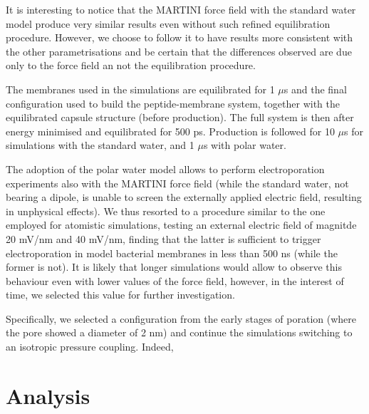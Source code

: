 It is interesting to notice that the MARTINI force field with the standard water model produce very similar results even without such refined equilibration procedure. However, we choose to follow it to have results more consistent with the other parametrisations and be certain that the differences observed are due only to the force field an not the equilibration procedure.

The membranes used in the simulations are equilibrated for 1 $\mu$s and the final configuration used to build the peptide-membrane system, together with the equilibrated capsule structure (before production). The full system is then after energy minimised and equilibrated for 500 ps.
%
Production is followed for 10 $\mu$s for simulations with the standard water, and 1 $\mu$s with polar water.

The adoption of the polar water model allows to perform electroporation experiments also with the MARTINI force field (while the standard water, not bearing a dipole, is unable to screen the externally applied electric field, resulting in unphysical effects).
%
We thus resorted to a procedure similar to the one employed for atomistic simulations, testing an external electric field of magnitde 20 mV/nm and 40 mV/nm, finding that the latter is sufficient to trigger electroporation in model bacterial membranes in less than 500 ns (while the former is not). It is likely that longer simulations would allow to observe this behaviour even with lower values of the force field, however, in the interest of time, we selected this value for further investigation.

Specifically, we selected a configuration from the early stages of poration (where the pore showed a diameter of 2 nm) and continue the simulations switching to an isotropic pressure coupling. Indeed, 




\section{Analysis} \label{sec:analysis}

